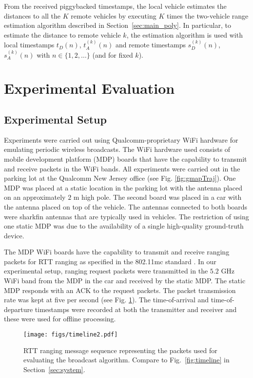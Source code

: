 \documentclass[12pt,journal,final,onecolumn]{IEEEtran}
\theoremstyle{definition}
\theoremstyle{myremark}
\begin{document}
From the received piggybacked timestamps, the local vehicle estimates the
distances to all the $K$ remote vehicles by executing $K$ times the two-vehicle
range estimation algorithm described in Section~\ref{sec:main_poly}. In
particular, to estimate the distance to remote vehicle $k$, the estimation
algorithm is used with local timestamps $t_D(n)$, $t_A^{(k)}(n)$ and remote
timestamps $s_D^{(k)}(n)$, $s_A^{(k)}(n)$ with $n\in\{1,2,\dots\}$ (and for fixed
$k$).


\section{Experimental Evaluation}
\label{sec:experiments}


\subsection{Experimental Setup}
\label{sec:experiments_setup}

Experiments were carried out using Qualcomm-proprietary WiFi hardware for
emulating periodic wireless broadcasts. The WiFi hardware used consists of
mobile development platform (MDP) boards that have the capability to transmit
and receive packets in the WiFi bands. All experiments were carried out in the
parking lot at the Qualcomm New Jersey office (see Fig. \ref{fig:gmapTraj}). One
MDP was placed at a static location in the parking lot with the antenna placed
on an approximately $2$ m high pole. The second board was placed in a car with
the antenna placed on top of the vehicle. The antennas connected to both boards
were sharkfin antennas that are typically used in vehicles. The restriction of
using one static MDP was due to the availability of a single high-quality
ground-truth device.

The MDP WiFi boards have the capability to transmit and receive ranging packets
for RTT ranging as specified in the 802.11mc standard \cite{11mc}. In our
experimental setup, ranging request packets were transmitted in the $5.2$ GHz
WiFi band from the MDP in the car and received by the static MDP. The static MDP
responds with an ACK to the request packets. The packet transmission rate was
kept at five per second (see Fig. \ref{fig:ftmdsrc}). The time-of-arrival and
time-of-departure timestamps were recorded at both the transmitter and receiver
and these were used for offline processing. 

\begin{figure}[htbp]
    \centering 
    \texttt{[image: figs/timeline2.pdf]} 
    \caption{RTT ranging message sequence representing the packets used for 
        evaluating the broadcast algorithm. Compare to Fig.~\ref{fig:timeline}
        in Section~\ref{sec:system}.}
    \label{fig:ftmdsrc}
\end{figure}
\end{document}
